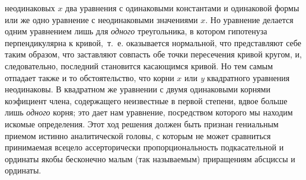 {неодинаковых $x$ два уравнения с одинаковыми
константами и одинаковой формы или же одно уравнение с неодинаковыми
значениями $x$. Но уравнение делается одним уравнением лишь для
{\em одного} треугольника, в котором гипотенуза
перпендикулярна к кривой,~т.~е. оказывается нормальной, что представляют
себе таким образом, что заставляют совпасть обе точки пересечения кривой
кругом, и, следовательно, последний становится касающимся кривой. Но тем
самым отпадает также и то обстоятельство, что корни
$x$ или {\em y} квадратного уравнения неодинаковы. В квадратном
же уравнении с двумя одинаковыми корнями коэфициент члена, содержащего
неизвестные в первой степени, вдвое больше лишь
{\em одного} корня; это дает нам уравнение, посредством
которого мы находим искомые определения. Этот ход решения должен быть
признан гениальным приемом истинно аналитической головы, с которым не может
сравниться принимаемая всецело ассерторически пропорциональность
подкасательной и ординаты якобы бесконечно малым (так называемым)
приращениям абсциссы и ординаты.

}
